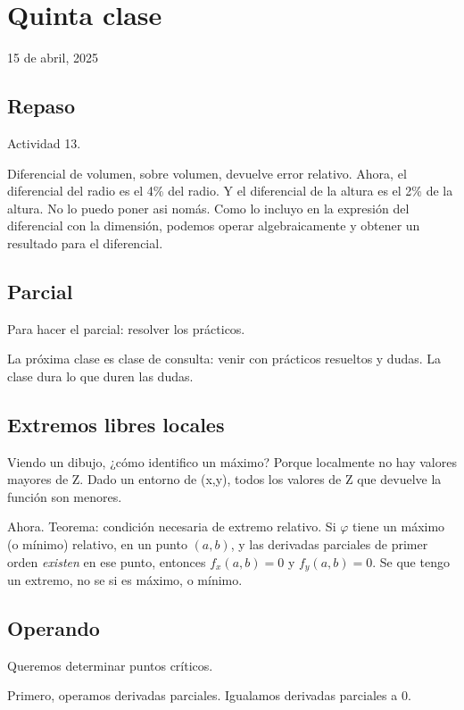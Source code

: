 \section{Quinta clase}

15 de abril, 2025

\subsection{Repaso}

Actividad 13.

Diferencial de volumen, sobre volumen, devuelve error relativo.
Ahora, el diferencial del radio es el 4\% del radio.
Y el diferencial de la altura es el 2\% de la altura.
No lo puedo poner asi nomás.
Como lo incluyo en la expresión del diferencial con la dimensión,
podemos operar algebraicamente y obtener un resultado para el diferencial.

\subsection{Parcial}

Para hacer el parcial: resolver los prácticos.

La próxima clase es clase de consulta: venir con prácticos resueltos y dudas.
La clase dura lo que duren las dudas.

\subsection{Extremos libres locales}

Viendo un dibujo, ¿cómo identifico un máximo?
Porque localmente no hay valores mayores de Z.
Dado un entorno de (x,y), todos los valores de Z que devuelve la función son menores.

Ahora.
Teorema: condición necesaria de extremo relativo.
Si \(\varphi\) tiene un máximo (o mínimo) relativo,
en un punto \((a,b)\),
y las derivadas parciales de primer orden \textit{existen} en ese punto,
entonces \(f_x(a,b) = 0\) y \(f_y(a,b) = 0\).
Se que tengo un extremo, no se si es máximo, o mínimo.

\subsection{Operando}

Queremos determinar puntos críticos.

Primero, operamos derivadas parciales.
Igualamos derivadas parciales a 0.


